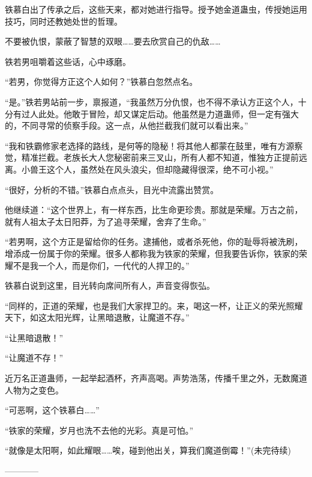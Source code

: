 \begin{this_body}
铁慕白出了传承之后，这些天来，都对她进行指导。授予她金道蛊虫，传授她运用技巧，同时还教她处世的哲理。

不要被仇恨，蒙蔽了智慧的双眼……要去欣赏自己的仇敌……

铁若男咀嚼着这些话，心中琢磨。

“若男，你觉得方正这个人如何？”铁慕白忽然点名。

“是。”铁若男站前一步，禀报道，“我虽然万分仇恨，也不得不承认方正这个人，十分有过人此处。他敢于冒险，却又谋定后动。他虽然是力道蛊师，但一定有强大的，不同寻常的侦察手段。这一点，从他拦截我们就可以看出来。”

“我和铁霸修家老选择的路线，是何等的隐秘！将其他人都蒙在鼓里，唯有方源察觉，精准拦截。老族长大人您秘密前来三叉山，所有人都不知道，惟独方正提前远离。小兽王这个人，虽然处在风头浪尖，但却隐藏得很深，绝不可小视。”

“很好，分析的不错。”铁慕白点点头，目光中流露出赞赏。

他继续道：“这个世界上，有一样东西，比生命更珍贵。那就是荣耀。万古之前，就有人祖太子太日阳莽，为了追寻荣耀，舍弃了生命。”

“若男啊，这个方正是留给你的任务。逮捕他，或者杀死他，你的耻辱将被洗刷，增添成一份属于你的荣耀。很多人都称我为铁家的荣耀，但我要告诉你，铁家的荣耀不是我一个人，而是你们，一代代的人捍卫的。”

铁慕白说到这里，目光转向席间所有人，声音变得恢弘。

“同样的，正道的荣耀，也是我们大家捍卫的。来，喝这一杯，让正义的荣光照耀天下，如这太阳光辉，让黑暗退散，让魔道不存。”

“让黑暗退散！”

“让魔道不存！”

近万名正道蛊师，一起举起酒杯，齐声高喝。声势浩荡，传播千里之外，无数魔道人物为之变色。

“可恶啊，这个铁慕白……”

“铁家的荣耀，岁月也洗不去他的光彩。真是可怕。”

“就像是太阳啊，如此耀眼……唉，碰到他出关，算我们魔道倒霉！”(未完待续)

------------

\end{this_body}

